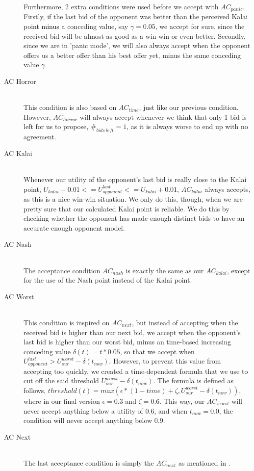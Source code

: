 \begin{description}
Furthermore, 2 extra conditions were used before we accept with $AC_{panic}$. Firstly, if the last bid of the opponent was better than the perceived Kalai point minus a conceding value, say $\gamma = 0.05$, we accept for sure, since the received bid will be almost as good as a win-win or even better. Secondly, since we are in 'panic mode', we will also always accept when the opponent offers us a better offer than his best offer yet, minus the same conceding value $\gamma$.

  \item[AC Horror] \hfill \\
This condition is also based on $AC_{time}$, just like our previous condition. However, $AC_{horror}$ will always accept whenever we think that only 1 bid is left for us to propose, $\#_{bids~left} = 1$, as it is always worse to end up with no agreement.

  \item[AC Kalai] \hfill \\
Whenever our utility of the opponent's last bid is really close to the Kalai point, $U_{kalai} - 0.01 <= U_{opponent}^{last} <= U_{kalai} + 0.01$, $AC_{kalai}$ always accepts, as this is a nice win-win situation. We only do this, though, when we are pretty sure that our calculated Kalai point is reliable. We do this by checking whether the opponent has made enough distinct bids to have an accurate enough opponent model.

  \item[AC Nash] \hfill \\
The acceptance condition $AC_{nash}$ is exactly the same as our $AC_{kalai}$, except for the use of the Nash point instead of the Kalai point.

  \item[AC Worst] \hfill \\
This condition is inspired on $AC_{next}$\cite{baarslag2013acceptance}, but instead of accepting when the received bid is higher than our next bid, we accept when the opponent's last bid is higher than our worst bid, minus an time-based increasing conceding value $\delta(t) = t * 0.05$, so that we accept when $U_{opponent}^{last} > U_{our}^{worst} - \delta(t_{now})$. However, to prevent this value from accepting too quickly, we created a time-dependent formula that we use to cut off the said threshold $U_{our}^{worst} - \delta(t_{now})$. The formula is defined as follows, $threshold(t) = max(\epsilon * (1-time) + \zeta, U_{our}^{worst} - \delta(t_{now}))$, where in our final version $\epsilon = 0.3$ and $\zeta = 0.6$. This way, our $AC_{worst}$ will never accept anything below a utility of 0.6, and when $t_{now} = 0.0$, the condition will never accept anything below 0.9.

  \item[AC Next] \hfill \\
The last acceptance condition is simply the $AC_{next}$ as mentioned in \cite{baarslag2013acceptance}.

\end{description}

